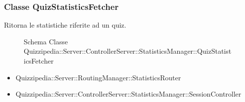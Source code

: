 \subsubsection{Classe QuizStatisticsFetcher}
Ritorna le statistiche riferite ad un quiz.
\begin{figure}[H]
\centering
\noindent{}
\caption{Schema Classe Quizzipedia::Server::ControllerServer::StatisticsManager::QuizStatisticsFetcher}
\end{figure}
\begin{itemize}
\item Quizzipedia::Server::RoutingManager::StatisticsRouter
\end{itemize}
\begin{itemize}
\item Quizzipedia::Server::ControllerServer::StatisticsManager::SessionController
\end{itemize}
